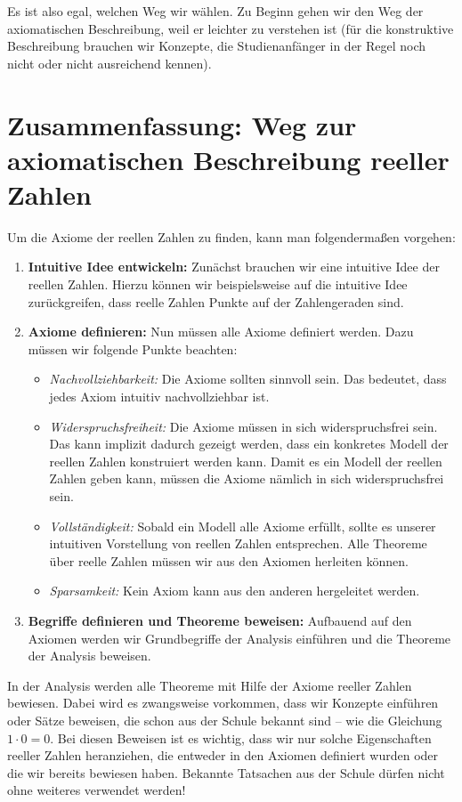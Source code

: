 \documentclass[fontsize=9pt,
               parskip=half-,
               DIV=14,
               listof=chapterentry,
               tocflat]{scrbook}
\begin{document}
Es ist also egal, welchen Weg wir wählen. Zu Beginn gehen wir den Weg der axiomatischen Beschreibung, weil er leichter zu verstehen ist (für die konstruktive Beschreibung brauchen wir Konzepte, die Studienanfänger in der Regel noch nicht oder nicht ausreichend kennen).

\section{Zusammenfassung: Weg zur axiomatischen Beschreibung reeller Zahlen}

Um die Axiome der reellen Zahlen zu finden, kann man folgendermaßen vorgehen:

\begin{enumerate}
\item \textbf{Intuitive Idee entwickeln:} Zunächst brauchen wir eine intuitive Idee der reellen Zahlen. Hierzu können wir beispielsweise auf die intuitive Idee zurückgreifen, dass reelle Zahlen Punkte auf der Zahlengeraden sind.
\item \textbf{Axiome definieren:} Nun müssen alle Axiome definiert werden. Dazu müssen wir folgende Punkte beachten: \begin{itemize}
\item \emph{Nachvollziehbarkeit:} Die Axiome sollten sinnvoll sein. Das bedeutet, dass jedes Axiom intuitiv nachvollziehbar ist.
\item \emph{Widerspruchsfreiheit:} Die Axiome müssen in sich widerspruchsfrei sein. Das kann implizit dadurch gezeigt werden, dass ein konkretes Modell der reellen Zahlen konstruiert werden kann. Damit es ein Modell der reellen Zahlen geben kann, müssen die Axiome nämlich in sich widerspruchsfrei sein.
\item \emph{Vollständigkeit:} Sobald ein Modell alle Axiome erfüllt, sollte es unserer intuitiven Vorstellung von reellen Zahlen entsprechen. Alle Theoreme über reelle Zahlen müssen wir aus den Axiomen herleiten können.
\item \emph{Sparsamkeit:} Kein Axiom kann aus den anderen hergeleitet werden.
\end{itemize}


\item \textbf{Begriffe definieren und Theoreme beweisen:} Aufbauend auf den Axiomen werden wir Grundbegriffe der Analysis einführen und die Theoreme der Analysis beweisen.
\end{enumerate}

In der Analysis werden alle Theoreme mit Hilfe der Axiome reeller Zahlen bewiesen. Dabei wird es zwangsweise vorkommen, dass wir Konzepte einführen oder Sätze beweisen, die schon aus der Schule bekannt sind – wie die Gleichung $1\cdot 0=0$. Bei diesen Beweisen ist es wichtig, dass wir nur solche Eigenschaften reeller Zahlen heranziehen, die entweder in den Axiomen definiert wurden oder die wir bereits bewiesen haben. Bekannte Tatsachen aus der Schule dürfen nicht ohne weiteres verwendet werden!
\end{document}
